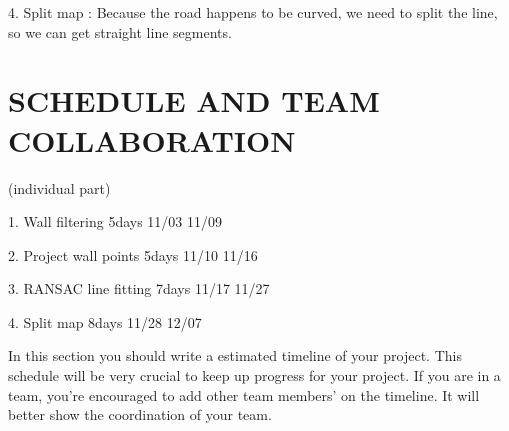 \documentclass[letterpaper, 10 pt, conference]{ieeeconf}  %
\begin{document}
4. Split map : Because the road happens to be curved, we need to split the line, so we can get straight line segments.


\section{SCHEDULE AND TEAM COLLABORATION}

(individual part)

1. Wall filtering	    5days	11/03	11/09

2. Project wall points	5days	11/10	11/16

3. RANSAC line fitting	7days	11/17	11/27

4. Split map	        8days	11/28	12/07

In this section you should write a estimated timeline of your project. This schedule will be very crucial to keep up progress for your project. If you are in a team, you're encouraged to add other team members' on the timeline. It will better show the coordination of your team.
   

\addtolength{\textheight}{-12cm}   %



\end{document}
